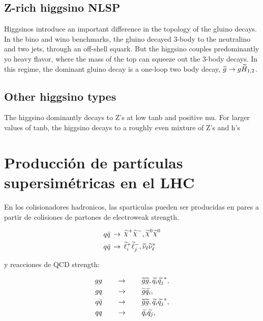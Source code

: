 \subsection{Z-rich higgsino NLSP}

Higgsinos introduce  an important difference in the topology of the gluino decays. In the bino and wino benchmarks, the gluino decayed 3-body to the neutralino and two jets,
through an off-shell squark. But the higgsino couples predominantly yo heavy flavor, where the mass of the top can squeeze out the 3-body decays. In this regime, the dominant gluino decay is
a one-loop two body decay, $\widetilde{g}\rightarrow g\widetilde{H}_{1,2}$.

\subsection{Other higgsino types}

The higgsino dominantly decays to Z's at low tanb and positive mu. For larger values of tanb, the higgsino decays to a roughly even mixture of Z's and h's


\section{Producción de partículas supersimétricas en el LHC}


En los colisionadores hadronicos, las sparticulas pueden ser producidas en pares a partir
de colisiones de partones de electroweak strength.

\begin{align}
  &q\bar{q} \, \to \, \chinop \chinom, \nino \nino \\
  &q\bar{q} \, \to \, \susy{\ell}^{+}_{i}\susy{\ell}^{-}_{j}, \susy{\nu}_{\ell}\susy{\nu}^{*}_{\ell}
\end{align}

y reacciones de QCD strength:

\begin{align}
  gg \qquad &\rightarrow \qquad \widetilde{g}\widetilde{g}, \widetilde{q_i}\widetilde{q_j}^{*}, \label{eq:gg}\\
  gq \qquad &\rightarrow \qquad \widetilde{g}\widetilde{q_i}, \label{eq:gq} \\
  q\bar{q} \qquad &\rightarrow \qquad \widetilde{g}\widetilde{g}, \widetilde{q_i}\widetilde{q_j}^{*}, \label{eq:qqbar} \\
  qq \qquad &\rightarrow \qquad \widetilde{q_i}\widetilde{q_j}, \label{eq:qq} \\
\end{align}

